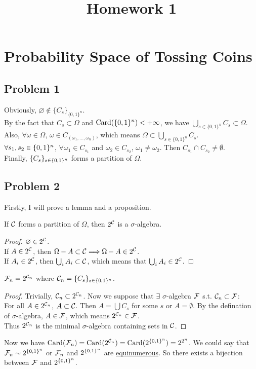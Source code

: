 \documentclass{article}
\begin{document}
\title{Homework 1}
\maketitle

\section{Probability Space of Tossing Coins}
\subsection*{\centering Problem 1}
Obviously, $\varnothing\notin\{C_s\}_{\{0,1\}^n}$.
\\
By the fact that $C_s\subset\Omega$ and  $\mbox{Card}\qty(\{0,1\}^n)<+\infty$, we have $\bigcup_{s\in\{0,1\}^n}C_s\subset\Omega$.
\\
Also, $\forall\omega\in\Omega$, $\omega\in C_{(\omega_1, \dots,\omega_n)}$, which means $\Omega\subset\bigcup_{s\in\{0,1\}^n}C_s$.
\\
$\forall s_1,s_2\in\{0,1\}^n$, $\forall\omega_1\in C_{s_1}$ and $\omega_2\in C_{s_2}$, $\omega_1\ne \omega_2$. Then $C_{s_1}\cap C_{s_2}\ne \emptyset$.
\\
Finally, $\{C_s\}_{s\in\{0,1\}^n}$ forms a partition of  $\Omega$.

\subsection*{\centering Problem 2}
Firstly, I will prove a lemma and a proposition.
\begin{lemma}
	\label{fc}
	If $\mathcal{C}$ forms a partition of $\Omega$, then  $2^{\mathcal{C}}$ is a  $\sigma$-algebra.
\end{lemma}
\begin{proof}
		$\varnothing\in 2^{\mathcal{C}}$.\\
		If $A\in 2^{\mathcal{C}}$, then $\Omega-A\subset\mathcal{C}\Longrightarrow\Omega-A\in 2^{\mathcal{C}}$.\\
		If $A_i\in 2^{\mathcal{C}}$, then $\bigcup_iA_i\subset\mathcal{C}$, which means that $\bigcup_iA_i\in 2^{\mathcal{C}}$.
\end{proof}
\begin{prp}
	$\mathcal{F}_n=2^{\mathcal{C}_n}$ where $\mathcal{C}_n={\{C_s\}_{s\in\{0,1\}^n}}$. 
\end{prp}
\begin{proof}
	Trivially, $\mathcal{C}_n\subset 2^{\mathcal{C}_n}$. Now we suppose that $\exists$ $\sigma$-algebra  $\mathcal{F}$ s.t. $\mathcal{C}_n\subset\mathcal{F}$:
\\
For all $A\in 2^{\mathcal{C}_n}$, $A\subset\mathcal{C}$. Then $A=\bigcup C_s$ for some $s$ or $A=\emptyset$. By the defination of $\sigma$-algebra, $A\in\mathcal{F}$, which means  $2^{\mathcal{C}_n}\in\mathcal{F}$.
\\
Thus $2^{\mathcal{C}_n}$ is the minimal  $\sigma$-algebra containing sets in $\mathcal{C}$.
\end{proof}
Now we have $\text{Card}(\mathcal{F}_n)=\text{Card}(2^{\mathcal{C}_n})=\text{Card}(2^{\{0,1\}^n})=2^{2^n}$. We could say that $\mathcal{F}_n\sim 2^{\{0,1\}^n}$ or $\mathcal{F}_n$ and $2^{\{0,1\}^n}$ are \href{https://mathworld.wolfram.com/Equinumerous.html}{equinumerous}. So there exists a bijection between $\mathcal{F}$ and  $2^{\{0,1\}^n}$.
\end{document}
